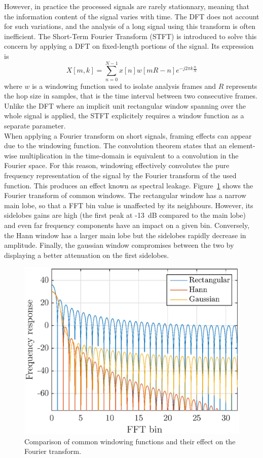 \documentclass[12pt,times,onecolumn]{article}
\begin{document}
However, in practice the processed signals are rarely stationnary, meaning that the information content of the signal varies with time. The DFT does not account for such variations, and the analysis of a long signal using this transform is often inefficient. The Short-Term Fourier Transform (STFT) is introduced to solve this concern by applying a DFT on fixed-length portions of the signal. Its expression is
\begin{equation} \label{eq:2}
X[m, k] = \sum\limits_{n = 0}^{N-1} x[n]w[mR-n]e^{-j2\pi k\frac{n}{N}}
\end{equation}
where $w$ is a windowing function used to isolate analysis frames and $R$ represents the hop size in samples, that is the time interval between two consecutive frames. Unlike the DFT where an implicit unit rectangular window spanning over the whole signal is applied, the STFT explicitely requires a window function as a separate parameter.\\

When applying a Fourier transform on short signals, framing effects can appear due to the windowing function. The convolution theorem states that an element-wise multiplication in the time-domain is equivalent to a convolution in the Fourier space. For this reason, windowing effectively convolutes the pure frequency representation of the signal by the Fourier transform of the used function. This produces an effect known as spectral leakage. Figure~\ref{fig:fft_win} shows the Fourier transform of common windows. The rectangular window has a narrow main lobe, so that a FFT bin value is unaffected by its neighbours. However, its sidelobes gains are high (the first peak at -13~dB compared to the main lobe) and even far frequency components have an impact on a given bin. Conversely, the Hann window has a larger main lobe but the sidelobes rapidly decrease in amplitude. Finally, the gaussian window compromises between the two by displaying a better attenuation on the first sidelobes.

\begin{figure}[htbp]
	\centering
		\includegraphics[width=0.5\columnwidth]{figures/fft_win.eps}
	\caption{Comparison of common windowing functions and their effect on the Fourier transform.}
	\label{fig:fft_win}
\end{figure}
\end{document}
